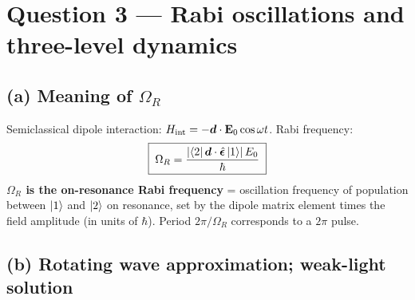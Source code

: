 \documentclass[11pt]{article}
\begin{document}
\section*{Question 3 --- Rabi oscillations and three-level dynamics}

\subsection*{(a) Meaning of $\Omega_R$}

Semiclassical dipole interaction: $H_\text{int}=-\bm{d}\cdot\vb E_0\cos\omega t$. Rabi frequency:
\[
\boxed{\;\Omega_R = \frac{|\!\bra{2}\bm{d}\cdot\hat{\bm\epsilon}\ket{1}\!|\,E_0}{\hbar}\;}
\]
\textbf{$\Omega_R$ is the on-resonance Rabi frequency} = oscillation frequency of population between $\ket{1}$ and $\ket{2}$ on resonance, set by the dipole matrix element times the field amplitude (in units of $\hbar$). Period $2\pi/\Omega_R$ corresponds to a $2\pi$ pulse.

\subsection*{(b) Rotating wave approximation; weak-light solution}
\end{document}
